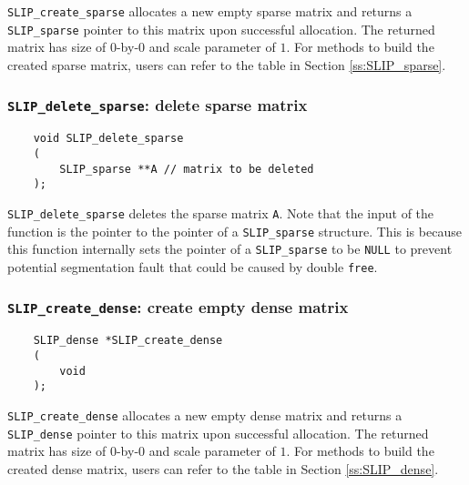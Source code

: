 \documentclass[11pt]{article}
\theoremstyle{definition}
\begin{document}
\verb|SLIP_create_sparse| allocates a new empty sparse matrix and returns a
\verb|SLIP_sparse| pointer to this matrix upon successful allocation.  The
returned matrix has size of $0$-by-$0$ and scale parameter of $1$. For methods
to build the created sparse matrix, users can refer to the table in Section
\ref{ss:SLIP_sparse}.

\cprotect\subsubsection{\verb|SLIP_delete_sparse|: delete sparse matrix}
\label{ss:delete_sparse}

\begin{mdframed}[userdefinedwidth=6in]
{\footnotesize
\begin{verbatim}
    void SLIP_delete_sparse
    (
        SLIP_sparse **A // matrix to be deleted
    );
\end{verbatim}
} \end{mdframed}

\verb|SLIP_delete_sparse| deletes the sparse matrix \verb|A|. Note that the
input of the function is the pointer to the pointer of a \verb|SLIP_sparse|
structure. This is because this function internally sets the pointer of a
\verb|SLIP_sparse| to be \verb|NULL| to prevent potential segmentation fault
that could be caused by double \verb|free|.

\cprotect\subsubsection{\verb|SLIP_create_dense|: create empty dense matrix}
\label{ss:create_dense}

\begin{mdframed}[userdefinedwidth=6in]
{\footnotesize
\begin{verbatim}
    SLIP_dense *SLIP_create_dense
    (
        void
    );
\end{verbatim}
} \end{mdframed}

\verb|SLIP_create_dense| allocates a new empty dense matrix and returns a
\verb|SLIP_dense| pointer to this matrix upon successful allocation. The
returned matrix has size of $0$-by-$0$ and scale parameter of $1$. For methods
to build the created dense matrix, users can refer to the table in Section
\ref{ss:SLIP_dense}.
\end{document}
